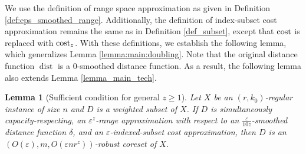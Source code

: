 \documentclass[11pt,letterpaper]{article}
\newtheorem{lemma}[theorem]{Lemma}
\theoremstyle{definition}
\newcommand{\eps}{\varepsilon}
\DeclareMathOperator{\dist}{dist}
\begin{document}
We use the definition of range space approximation as given in Definition \ref{def:eps_smoothed_range}.  
%
Additionally, the definition of index-subset cost approximation remains the same as in Definition \ref{def_subset}, except that \( \cost \) is replaced with \( \cost_z \).  
%
With these definitions, we establish the following lemma, which generalizes Lemma \ref{lemma:main:doubling}.
%
Note that the original distance function \( \dist \) is a 0-smoothed distance function.  
%
As a result, the following lemma also extends Lemma \ref{lemma_main_tech}.
%

\begin{lemma}[Sufficient condition for general $z\geq 1$] \label{lemma:main:kzC}
    Let $X$ be an $(r,k_0)$-regular instance of size $n$ and $D$ is a weighted subset of $X$. 
    If $D$ is simultaneously capacity-respecting, an $\eps^z$-range approximation with respect to an $\frac{\eps}{10z}$-smoothed distance function $\delta$, and an $\eps$-indexed-subset cost approximation, then $D$ is an $(O(\eps), m, O(\eps n r^z))$-robust coreset of $X$.
\end{lemma}
\end{document}
